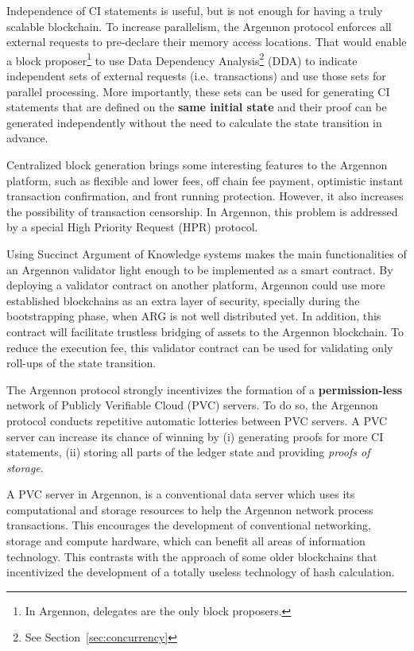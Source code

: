 Independence of CI statements is useful, but is not enough for having a truly scalable blockchain. To increase
parallelism, the Argennon protocol enforces all external requests to pre-declare their memory access locations. That
would enable a block proposer\footnote{In Argennon, delegates are the only block proposers.} to use Data Dependency
Analysis\footnote{See Section~\ref{sec:concurrency}} (DDA) to indicate independent sets of external requests (i.e.\
transactions) and use those sets for parallel processing. More importantly, these sets can be used for generating CI
statements that are defined on the \textbf{same initial state} and their proof can be generated independently without
the need to calculate the state transition in advance.

Centralized block generation brings some interesting features to the Argennon platform, such as flexible and lower
fees, off chain fee payment, optimistic instant transaction confirmation, and front running protection.
However, it also increases the possibility of transaction censorship. In Argennon, this problem is addressed by a
special High Priority Request (HPR) protocol.

Using Succinct Argument of Knowledge systems makes the main functionalities of an Argennon validator light enough to
be implemented as a smart contract. By deploying a validator contract on another platform, Argennon
could use more established blockchains as an extra layer of security, specially
during the bootstrapping phase, when ARG is not well distributed yet. In addition, this contract will facilitate
trustless bridging of assets to the Argennon blockchain. To reduce the execution fee, this validator
contract can be used for validating only roll-ups of the state transition.

The Argennon protocol strongly incentivizes the formation of a \textbf{permission-less} network of Publicly Verifiable
Cloud (PVC) servers. To do so, the Argennon protocol conducts repetitive automatic lotteries between PVC servers.
A PVC server can increase its chance of winning by (i) generating proofs for more CI statements, (ii) storing all
parts of the ledger state and providing \emph{proofs of storage}.

A PVC server in Argennon, is a conventional data server which uses its computational and
storage resources to help the Argennon network process transactions. This encourages the development
of conventional networking, storage and compute hardware, which can benefit all areas of information technology.
This contrasts with the approach of some older blockchains that incentivized the development of a totally
useless technology of hash calculation.
